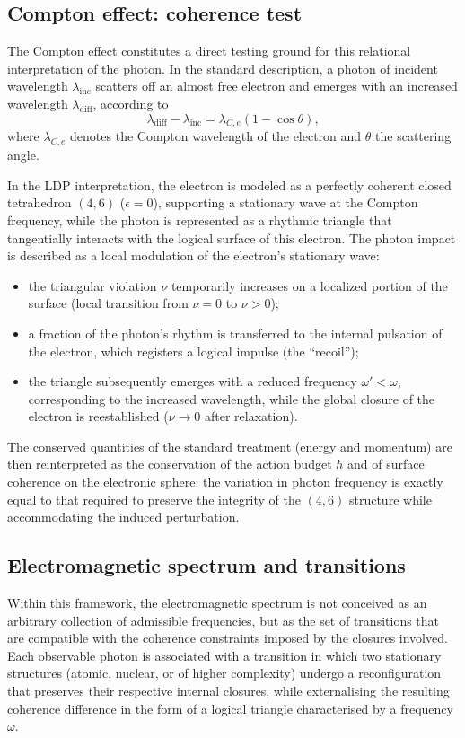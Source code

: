 \documentclass[11pt,a4paper]{article}
\begin{document}
\subsection{Compton effect: coherence test}

The Compton effect constitutes a direct testing ground for this relational interpretation of the photon. In the standard description, a photon of incident wavelength \(\lambda_{\mathrm{inc}}\) scatters off an almost free electron and emerges with an increased wavelength \(\lambda_{\mathrm{diff}}\), according to
\[
\lambda_{\mathrm{diff}} - \lambda_{\mathrm{inc}} = \lambda_{C,e} (1 - \cos\theta),
\]
where \(\lambda_{C,e}\) denotes the Compton wavelength of the electron and \(\theta\) the scattering angle.

In the LDP interpretation, the electron is modeled as a perfectly coherent closed tetrahedron \((4,6)\) (\(\epsilon = 0\)), supporting a stationary wave at the Compton frequency, while the photon is represented as a rhythmic triangle that tangentially interacts with the logical surface of this electron. The photon impact is described as a local modulation of the electron’s stationary wave:
\begin{itemize}[label=-]
    \item the triangular violation \(\nu\) temporarily increases on a localized portion of the surface (local transition from \(\nu = 0\) to \(\nu > 0\));
    \item a fraction of the photon’s rhythm is transferred to the internal pulsation of the electron, which registers a logical impulse (the “recoil”);
    \item the triangle subsequently emerges with a reduced frequency \(\omega' < \omega\), corresponding to the increased wavelength, while the global closure of the electron is reestablished (\(\nu \rightarrow 0\) after relaxation).
\end{itemize}

The conserved quantities of the standard treatment (energy and momentum) are then reinterpreted as the conservation of the action budget \(\hbar\) and of surface coherence on the electronic sphere: the variation in photon frequency is exactly equal to that required to preserve the integrity of the \((4,6)\) structure while accommodating the induced perturbation.

\subsection{Electromagnetic spectrum and transitions}
Within this framework, the electromagnetic spectrum is not conceived as an arbitrary collection of admissible frequencies, but as the set of transitions that are compatible with the coherence constraints imposed by the closures involved. Each observable photon is associated with a transition in which two stationary structures (atomic, nuclear, or of higher complexity) undergo a reconfiguration that preserves their respective internal closures, while externalising the resulting coherence difference in the form of a logical triangle characterised by a frequency \(\omega\).
\end{document}
